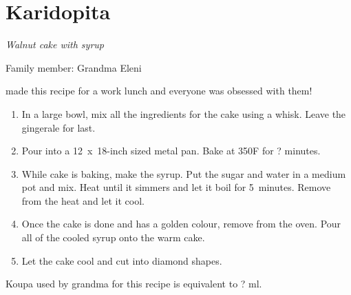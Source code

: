 \chapter{Karidopita}
\label{ch:karidopita}


\textit{Walnut cake with syrup}

Family member: Grandma Eleni

 made this recipe for a work lunch and everyone was obsessed with them!

\begin{enumerate}
    \item In a large bowl, mix all the ingredients for the cake using a whisk. Leave the gingerale for last.
    \item Pour into a 12~x~18-inch sized metal pan. Bake at 350\degree F for ? minutes.
    \item While cake is baking, make the syrup. Put the sugar and water in a medium pot and mix. Heat until it simmers and let it boil for 5~minutes. Remove from the heat and let it cool.
    \item Once the cake is done and has a golden colour, remove from the oven. Pour all of the cooled syrup onto the warm cake.
    \item Let the cake cool and cut into diamond shapes.
\end{enumerate}

Koupa used by grandma for this recipe is equivalent to ? ml.

